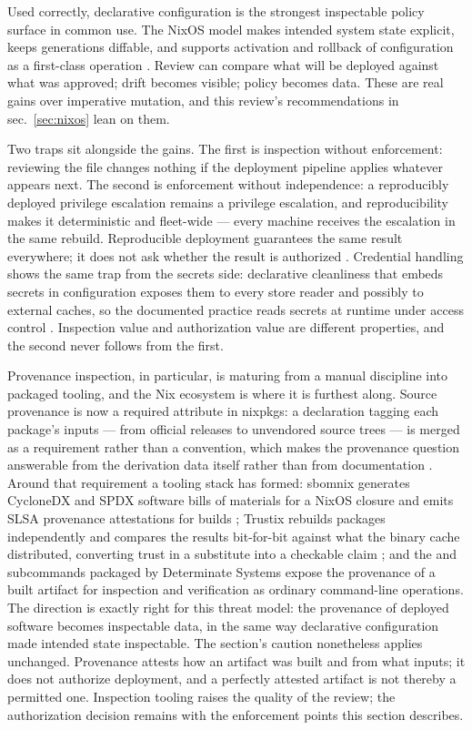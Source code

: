 \documentclass[
  english,
  9pt,
]{extarticle}
\newcounter{none} %
\begin{document}
Used correctly, declarative configuration is the strongest inspectable
policy surface in common use. The NixOS model makes intended system
state explicit, keeps generations diffable, and supports activation and
rollback of configuration as a first-class operation
\citep{nixos_wiki, nixos_rebuild_wiki}. Review can compare what will be
deployed against what was approved; drift becomes visible; policy
becomes data. These are real gains over imperative mutation, and this
review's recommendations in sec.~\ref{sec:nixos} lean on them.

Two traps sit alongside the gains. The first is inspection without
enforcement: reviewing the file changes nothing if the deployment
pipeline applies whatever appears next. The second is enforcement
without independence: a reproducibly deployed privilege escalation
remains a privilege escalation, and reproducibility makes it
deterministic and fleet-wide --- every machine receives the escalation
in the same rebuild. Reproducible deployment guarantees the same result
everywhere; it does not ask whether the result is authorized
\citep{nixos_reproducibility}. Credential handling shows the same trap
from the secrets side: declarative cleanliness that embeds secrets in
configuration exposes them to every store reader and possibly to
external caches, so the documented practice reads secrets at runtime
under access control \citep{nix_store_secrets}. Inspection value and
authorization value are different properties, and the second never
follows from the first.

Provenance inspection, in particular, is maturing from a manual
discipline into packaged tooling, and the Nix ecosystem is where it is
furthest along. Source provenance is now a required attribute in
nixpkgs: a  declaration tagging each
package's inputs --- from official releases to unvendored source trees
--- is merged as a requirement rather than a convention, which makes the
provenance question answerable from the derivation data itself rather
than from documentation \citep{nixpkgs_source_provenance}. Around that
requirement a tooling stack has formed: sbomnix generates CycloneDX and
SPDX software bills of materials for a NixOS closure and emits SLSA
provenance attestations for builds \citep{sbomnix}; Trustix rebuilds
packages independently and compares the results bit-for-bit against what
the binary cache distributed, converting trust in a substitute into a
checkable claim \citep{trustix_rebuilt}; and the
 and 
subcommands packaged by Determinate Systems expose the provenance of a
built artifact for inspection and verification as ordinary command-line
operations. The direction is exactly right for this threat model: the
provenance of deployed software becomes inspectable data, in the same
way declarative configuration made intended state inspectable. The
section's caution nonetheless applies unchanged. Provenance attests how
an artifact was built and from what inputs; it does not authorize
deployment, and a perfectly attested artifact is not thereby a permitted
one. Inspection tooling raises the quality of the review; the
authorization decision remains with the enforcement points this section
describes.
\end{document}
